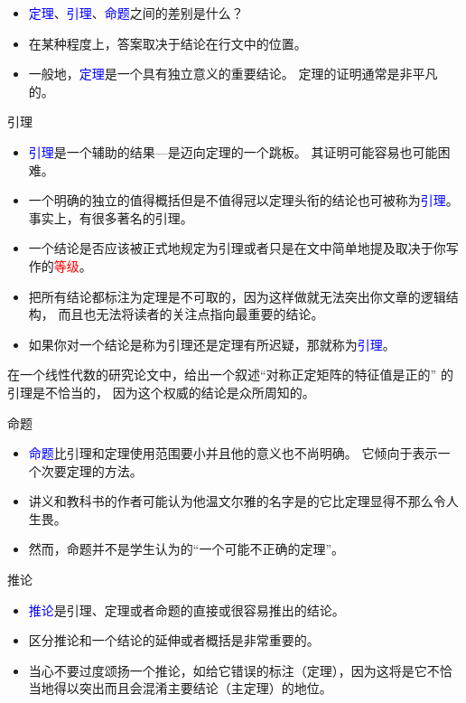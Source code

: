 \documentclass[13pt]{ctexbeamer}
\newcommand{\red}[1]{\textcolor{red}{#1}}
\newcommand{\blue}[1]{\textcolor{blue}{#1}}
\begin{document}
\begin{frame}
\begin{itemize}
\item \blue{定理}、\blue{引理}、\blue{命题}之间的差别是什么？
\item 在某种程度上，答案取决于结论在行文中的位置。
\item
一般地，\blue{定理}是一个具有独立意义的重要结论。
定理的证明通常是非平凡的。


\end{itemize}
\end{frame}




\begin{frame}{引理}

\begin{itemize}
	\item
	\blue{引理}是一个辅助的结果—是迈向定理的一个跳板。
	其证明可能容易也可能困难。

\item 一个明确的独立的值得概括但是不值得冠以定理头衔的结论也可被称为\blue{引理}。
事实上，有很多著名的引理。
\item
	一个结论是否应该被正式地规定为引理或者只是在文中简单地提及取决于你写作的\red{等级}。
\item
\alert{把所有结论都标注为定理是不可取的}，因为这样做就无法突出你文章的逻辑结构，
而且也无法将读者的关注点指向最重要的结论。
\item 如果你对一个结论是称为引理还是定理有所迟疑，那就称为\blue{引理}。
\end{itemize}


在一个线性代数的研究论文中，给出一个叙述``对称正定矩阵的特征值是正的'' 的引理是不恰当的，
因为这个权威的结论是众所周知的。

\end{frame}


\begin{frame}{命题}
\begin{itemize}
	\item
\blue{命题}比引理和定理使用范围要小并且他的意义也不尚明确。
它倾向于表示一个次要定理的方法。
\item 讲义和教科书的作者可能认为他温文尔雅的名字是的它比定理显得不那么令人生畏。
 \item 然而，命题并不是学生认为的“一个可能不正确的定理”。
\end{itemize}
\end{frame}

\begin{frame}{推论}
\begin{itemize}
\item \blue{推论}是引理、定理或者命题的直接或很容易推出的结论。
\item 区分推论和一个结论的延伸或者概括是非常重要的。
\item 当心不要过度颂扬一个推论，如给它错误的标注（定理），因为这将是它不恰当地得以突出而且会混淆主要结论（主定理）的地位。
\end{itemize}
\end{frame}
\end{document}

